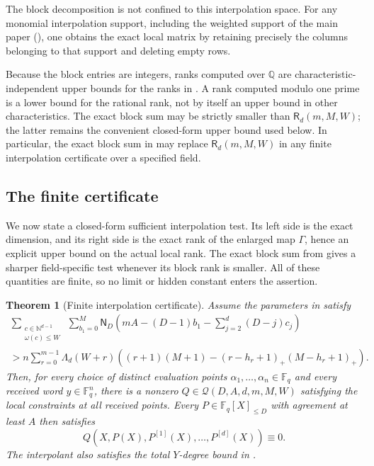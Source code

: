 \documentclass[11pt,letterpaper]{article}
\newtheorem{theorem}{Theorem}[section]
\theoremstyle{definition}
\newcommand{\F}{\mathbb{F}}
\newcommand{\N}{\mathbb{N}}
\newcommand{\Qspace}{\mathcal{Q}}
\newcommand{\positive}[1]{\left(#1\right)_{+}}
\begin{document}
The block decomposition is not confined to this interpolation space.  For any
monomial interpolation support, including the weighted support of the main paper
(), one obtains the exact local matrix by retaining
precisely the columns belonging to that support and deleting empty rows.

Because the block entries are integers, ranks computed over
\(\mathbb Q\) are characteristic-independent upper bounds for the ranks in
.  A rank computed modulo one prime is a
lower bound for the rational rank, not by itself an upper bound in other
characteristics.  The exact block sum may be strictly smaller than
\(\mathsf R_d(m,M,W)\); the latter remains the convenient closed-form
upper bound used below.  In particular, the exact block sum in
 may replace
\(\mathsf R_d(m,M,W)\) in any finite interpolation certificate over a
specified field.

\subsection{The finite certificate}

We now state a closed-form sufficient interpolation test.  Its left side is
the exact dimension, and its right side is the exact rank of the enlarged
map \(\Gamma\), hence an explicit upper bound on the actual local rank.  The
exact block sum from  gives a
sharper field-specific test whenever its block rank is smaller. All of these quantities are
finite, so no limit or hidden constant enters the assertion.

\begin{theorem}[Finite interpolation certificate]
\label{thm:finite-interpolation-certificate}
Assume the parameters in  satisfy
\begin{multline}
  \sum_{\substack{c\in\N^{d-1}\\\omega(c)\leq W}}
  \ \sum_{b_1=0}^{M}
  \mathsf N_D\left(
    mA-(D-1)b_1-
    \sum_{j=2}^{d}(D-j)c_j
  \right)
  \\
  >
  n\sum_{r=0}^{m-1}\Lambda_d(W+r)
  \left(
    (r+1)(M+1)
    -\positive{r-h_r+1}\positive{M-h_r+1}
  \right).
  \label{eq:finite-interpolation-certificate}
\end{multline}
Then, for every choice of distinct evaluation points
\(\alpha_1,\ldots,\alpha_n\in\F_q\) and every received word
\(y\in\F_q^n\), there is a nonzero
\(Q\in\Qspace(D,A,d,m,M,W)\) satisfying the local constraints at all received
points.  Every \(P\in\F_q[X]_{\leq D}\) with agreement at least \(A\) then
satisfies
\begin{equation}
  Q(X,P(X),P^{[1]}(X),\ldots,P^{[d]}(X))\equiv 0.
  \label{eq:certificate-differential-equation}
\end{equation}
The interpolant also satisfies the total \(Y\)-degree bound in
.
\end{theorem}
\end{document}
